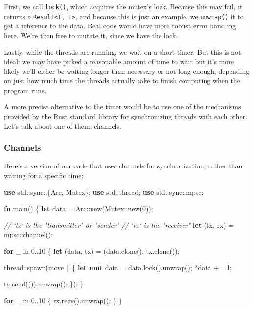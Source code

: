 \documentclass[a4paper,]{book}
\newenvironment{Shaded}{\begin{snugshade}}{\end{snugshade}}
\newcommand{\KeywordTok}[1]{\textcolor[rgb]{0.13,0.29,0.53}{\textbf{{#1}}}}
\newcommand{\DecValTok}[1]{\textcolor[rgb]{0.00,0.00,0.81}{{#1}}}
\newcommand{\CommentTok}[1]{\textcolor[rgb]{0.56,0.35,0.01}{\textit{{#1}}}}
\newcommand{\NormalTok}[1]{{#1}}
\begin{document}
First, we call \texttt{lock()}, which acquires the mutex's lock. Because
this may fail, it returns a
\texttt{Result\textless{}T,\ E\textgreater{}}, and because this is just
an example, we \texttt{unwrap()} it to get a reference to the data. Real
code would have more robust error handling here. We're then free to
mutate it, since we have the lock.

Lastly, while the threads are running, we wait on a short timer. But
this is not ideal: we may have picked a reasonable amount of time to
wait but it's more likely we'll either be waiting longer than necessary
or not long enough, depending on just how much time the threads actually
take to finish computing when the program runs.

A more precise alternative to the timer would be to use one of the
mechanisms provided by the Rust standard library for synchronizing
threads with each other. Let's talk about one of them: channels.

\subsubsection{Channels}\label{channels}

Here's a version of our code that uses channels for synchronization,
rather than waiting for a specific time:

\begin{Shaded}
\begin{Highlighting}[]
\KeywordTok{use} \NormalTok{std::sync::\{Arc, Mutex\};}
\KeywordTok{use} \NormalTok{std::thread;}
\KeywordTok{use} \NormalTok{std::sync::mpsc;}

\KeywordTok{fn} \NormalTok{main() \{}
    \KeywordTok{let} \NormalTok{data = Arc::new(Mutex::new(}\DecValTok{0}\NormalTok{));}

    \CommentTok{// `tx` is the "transmitter" or "sender"}
    \CommentTok{// `rx` is the "receiver"}
    \KeywordTok{let} \NormalTok{(tx, rx) = mpsc::channel();}

    \KeywordTok{for} \NormalTok{_ in }\DecValTok{0.}\NormalTok{.}\DecValTok{10} \NormalTok{\{}
        \KeywordTok{let} \NormalTok{(data, tx) = (data.clone(), tx.clone());}

        \NormalTok{thread::spawn(move || \{}
            \KeywordTok{let} \KeywordTok{mut} \NormalTok{data = data.lock().unwrap();}
            \NormalTok{*data += }\DecValTok{1}\NormalTok{;}

            \NormalTok{tx.send(()).unwrap();}
        \NormalTok{\});}
    \NormalTok{\}}

    \KeywordTok{for} \NormalTok{_ in }\DecValTok{0.}\NormalTok{.}\DecValTok{10} \NormalTok{\{}
        \NormalTok{rx.recv().unwrap();}
    \NormalTok{\}}
\NormalTok{\}}
\end{Highlighting}
\end{Shaded}
\end{document}
